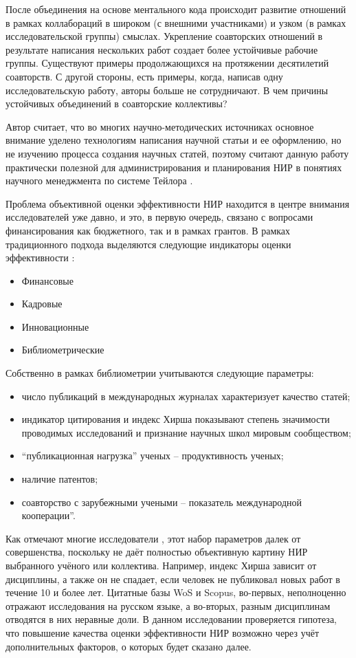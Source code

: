 После объединения на основе ментального кода происходит развитие отношений в рамках коллабораций в широком (с внешними участниками) и узком (в рамках исследовательской группы) смыслах. Укрепление соавторских отношений в результате написания нескольких работ создает более устойчивые рабочие группы. Существуют примеры продолжающихся на протяжении десятилетий соавторств. С другой стороны, есть примеры, когда, написав одну исследовательскую работу, авторы больше не сотрудничают. В чем причины устойчивых объединений в соавторские коллективы?

Автор считает, что во многих научно-методических источниках основное внимание уделено технологиям написания научной статьи и ее оформлению, но не изучению процесса создания научных статей, поэтому считают данную работу практически полезной для администрирования и планирования НИР в понятиях научного менеджмента по системе Тейлора \cite{taylor2004scientific} .

Проблема объективной оценки эффективности НИР находится в центре внимания исследователей уже давно, и это, в первую очередь, связано с вопросами финансирования как бюджетного, так и в рамках грантов. В рамках традиционного подхода выделяются следующие индикаторы оценки эффективности \cite{korol2014krit}:

\begin{itemize}
\tightlist
\item Финансовые
\item Кадровые
\item Инновационные
\item Библиометрические
\end{itemize}

Собственно в рамках библиометрии учитываются следующие параметры:

\begin{itemize}
\tightlist
\item число публикаций в международных журналах характеризует качество статей; 
\item индикатор цитирования и индекс Хирша показывают степень значимости проводимых исследований и признание научных школ мировым сообществом;
\item ``публикационная нагрузка'' ученых – продуктивность ученых; 
\item наличие патентов; 
\item соавторство с зарубежными учеными – показатель международной кооперации''.
\end{itemize}

Как отмечают многие исследователи \cite{vonortas1995new, veugelers1998collaboration, faems2005interorganizational }, этот набор параметров далек от совершенства, поскольку не даёт полностью объективную картину НИР выбранного учёного или коллектива. Например, индекс Хирша зависит от дисциплины, а также он не спадает, если человек не публиковал новых работ в течение 10 и более лет. Цитатные базы WoS и Scopus, во-первых, неполноценно отражают исследования на русском языке, а во-вторых, разным дисциплинам отводятся в них неравные доли. 
В данном исследовании проверяется гипотеза, что повышение качества оценки эффективности НИР возможно через учёт дополнительных факторов, о которых будет сказано далее.

